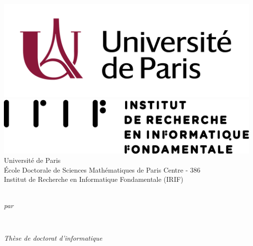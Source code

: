 
\begin{titlepage}
  \makeatletter
  \begin{center}
    \includegraphics[scale=.4]{assets/uparis_couleur_RVB.png} \hfill \includegraphics[scale=.4]{assets/IRIF_horizontal_version.png}\\
    \vspace{1em}
    Université de Paris\\
    École Doctorale de Sciences Mathématiques de Paris Centre - 386\\
    Institut de Recherche en Informatique Fondamentale (IRIF)\\
    \vspace{0.7cm}
    \begin{Huge}
      \@title
    \end{Huge}\\[0.1cm]
    \emph{par}\\
    \vspace{0.1cm}
    \begin{Large}\@author\end{Large}\\
    \vspace{0.7cm}
    \begin{Large}\emph{Thèse de doctorat d’informatique}\end{Large}\\
    \vspace{0.7cm}

\end{center}
\end{titlepage}

